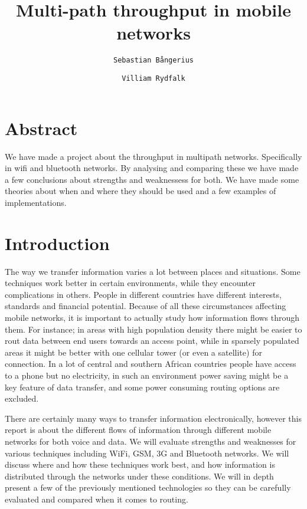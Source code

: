 \documentclass[11pt,twocolumn]{article}
\author{
  \texttt{Sebastian Bångerius}
  \and
  \texttt{Villiam Rydfalk}
}
\begin{document}

\title{Multi-path throughput in mobile networks}
\maketitle

\cleardoublepage


\section{Abstract}

We have made a project about the throughput in multipath networks. Specifically in wifi and bluetooth networks. By analysing and comparing these we have made a few conclusions about strengths and weaknessess for both. We have made some theories about when and where they should be used and a few examples of implementations.

\section{Introduction}

The way we transfer information varies a lot between places and situations. Some techniques work better in certain environments, while they encounter complications in others. People in different countries have different interests, standards and financial potential. Because of all these circumstances affecting mobile networks, it is important to actually study how information flows through them. For instance; in areas with high population density there might be easier to rout data between end users towards an access point, while in sparsely populated areas it might be better with one cellular tower (or even a satellite) for connection. In a lot of central and southern African countries people have access to a phone but no electricity, in such an environment power saving might be a key feature of data transfer, and some power consuming routing options are excluded.

There are certainly many ways to transfer information electronically, however this report is about the different flows of information through different mobile networks for both voice and data. We will evaluate strengths and weaknesses for various techniques including WiFi, GSM, 3G and Bluetooth networks. We will discuss where and how these techniques work best, and how information is distributed through the networks under these conditions. We will in depth present a few of the previously mentioned technologies so they can be carefully evaluated and compared when it comes to routing.
\end{document}
